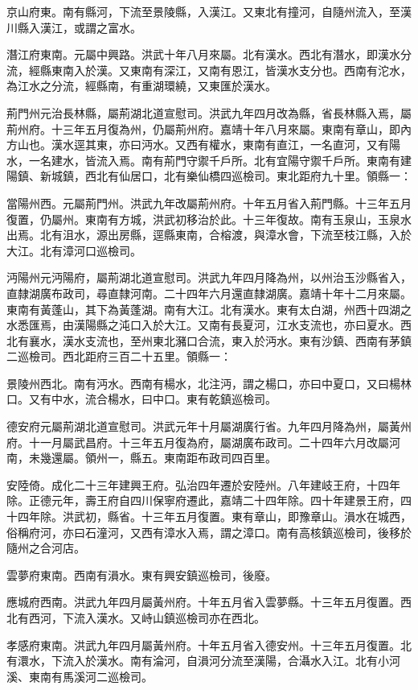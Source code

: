 京山府東。南有縣河，下流至景陵縣，入漢江。又東北有撞河，自隨州流入，至漢川縣入漢江，或謂之富水。

潛江府東南。元屬中興路。洪武十年八月來屬。北有漢水。西北有潛水，即漢水分流，經縣東南入於漢。又東南有深江，又南有恩江，皆漢水支分也。西南有沱水，為江水之分流，經縣南，有重湖環繞，又東匯於漢水。

荊門州元治長林縣，屬荊湖北道宣慰司。洪武九年四月改為縣，省長林縣入焉，屬荊州府。十三年五月復為州，仍屬荊州府。嘉靖十年八月來屬。東南有章山，即內方山也。漢水逕其東，亦曰沔水。又西有權水，東南有直江，一名直河，又有陽水，一名建水，皆流入焉。南有荊門守禦千戶所。北有宜陽守禦千戶所。東南有建陽鎮、新城鎮，西北有仙居口，北有樂仙橋四巡檢司。東北距府九十里。領縣一：

當陽州西。元屬荊門州。洪武九年改屬荊州府。十年五月省入荊門縣。十三年五月復置，仍屬州。東南有方城，洪武初移治於此。十三年復故。南有玉泉山，玉泉水出焉。北有沮水，源出房縣，逕縣東南，合榕渡，與漳水會，下流至枝江縣，入於大江。北有漳河口巡檢司。

沔陽州元沔陽府，屬荊湖北道宣慰司。洪武九年四月降為州，以州治玉沙縣省入，直隸湖廣布政司，尋直隸河南。二十四年六月還直隸湖廣。嘉靖十年十二月來屬。東南有黃蓬山，其下為黃蓬湖。南有大江。北有漢水。東有太白湖，州西十四湖之水悉匯焉，由漢陽縣之沌口入於大江。又南有長夏河，江水支流也，亦曰夏水。西北有襄水，漢水支流也，至州東北瀦口合流，東入於沔水。東有沙鎮、西南有茅鎮二巡檢司。西北距府三百二十五里。領縣一：

景陵州西北。南有沔水。西南有楊水，北注沔，謂之楊口，亦曰中夏口，又曰楊林口。又有中水，流合楊水，曰中口。東有乾鎮巡檢司。

德安府元屬荊湖北道宣慰司。洪武元年十月屬湖廣行省。九年四月降為州，屬黃州府。十一月屬武昌府。十三年五月復為府，屬湖廣布政司。二十四年六月改屬河南，未幾還屬。領州一，縣五。東南距布政司四百里。

安陸倚。成化二十三年建興王府。弘治四年遷於安陸州。八年建岐王府，十四年除。正德元年，壽王府自四川保寧府遷此，嘉靖二十四年除。四十年建景王府，四十四年除。洪武初，縣省。十三年五月復置。東有章山，即豫章山。溳水在城西，俗稱府河，亦曰石潼河，又西有漳水入焉，謂之漳口。南有高核鎮巡檢司，後移於隨州之合河店。

雲夢府東南。西南有溳水。東有興安鎮巡檢司，後廢。

應城府西南。洪武九年四月屬黃州府。十年五月省入雲夢縣。十三年五月復置。西北有西河，下流入漢水。又峙山鎮巡檢司亦在西北。

孝感府東南。洪武九年四月屬黃州府。十年五月省入德安州。十三年五月復置。北有澴水，下流入於漢水。南有淪河，自溳河分流至漢陽，合灄水入江。北有小河溪、東南有馬溪河二巡檢司。

